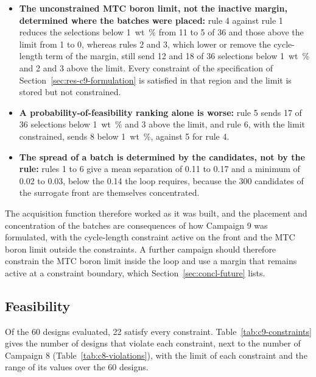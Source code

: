 \begin{itemize}
  \item \textbf{The unconstrained MTC boron limit, not the inactive margin, determined where the batches were placed:} rule 4 against rule 1 reduces
        the selections below \SI{1}{wt\%} from 11 to 5 of 36 and those
        above the limit from 1 to 0, whereas rules 2 and 3, which lower or remove the cycle-length term of the margin, still send 12
        and 18 of 36 selections below \SI{1}{wt\%} and 2 and 3 above
        the limit.
        Every constraint of the specification of
        Section~\ref{sec:res-c9-formulation} is satisfied in that region and the limit is stored but not constrained.
  \item \textbf{A probability-of-feasibility ranking alone is worse:}
        rule 5 sends 17 of 36 selections below \SI{1}{wt\%} and 3 above
        the limit, and rule 6, with the limit constrained, sends 8 below
        \SI{1}{wt\%}, against 5 for rule 4.
  \item \textbf{The spread of a batch is determined by the candidates,
        not by the rule:} rules 1 to 6 give a mean separation of 0.11
        to 0.17 and a minimum of 0.02 to 0.03, below the 0.14 the loop
        requires, because the 300 candidates of the surrogate front are
        themselves concentrated.
\end{itemize}

The acquisition function therefore worked as it was built, and the
placement and concentration of the batches are consequences of how
Campaign 9 was formulated, with the cycle-length constraint active on
the front and the MTC boron limit outside the constraints. A further
campaign should therefore constrain the MTC boron limit inside the loop and use a margin that remains
active at a constraint boundary, which Section~\ref{sec:concl-future}
lists.

\subsection{Feasibility}
\label{sec:res-c9-feasibility}

Of the 60 designs evaluated, 22 satisfy every constraint.
Table~\ref{tab:c9-constraints} gives the number of designs that violate
each constraint, next to the number of Campaign 8
(Table~\ref{tab:c8-violations}), with the limit of each constraint and
the range of its values over the 60 designs.

